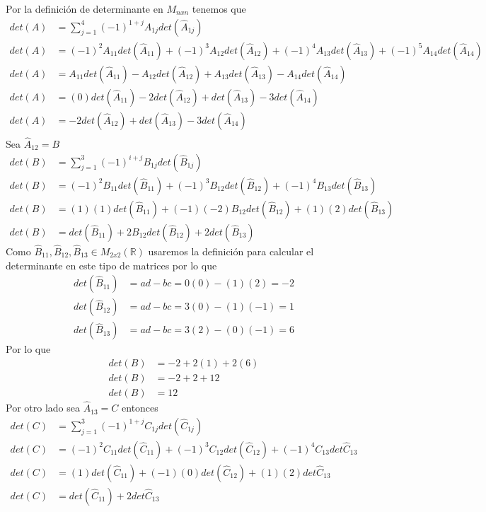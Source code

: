 \documentclass[letterpaper]{article}
\newcommand{\R}{\mathds{R}}
\renewcommand{\*}{\cdot}
\theoremstyle{definition}
\begin{document}
	Por la definición de determinante en $ M_{nxn} $ tenemos que 
	\begin{align*}
		det(A) &= \sum_{j = 1}^{4} (-1)^{1+j} A_{1j} det(\hat{A}_{1j})\\
		det(A) &= (-1)^{2} A_{11} det(\hat{A}_{11}) + (-1)^{3} A_{12} det(\hat{A}_{12}) + (-1)^{4} A_{13} det(\hat{A}_{13}) + (-1)^{5} A_{14} det(\hat{A}_{14})\\
		det(A) &= A_{11} det(\hat{A}_{11}) -A_{12} det(\hat{A}_{12}) +A_{13} det(\hat{A}_{13}) -A_{14} det(\hat{A}_{14})\\
		det(A) &= (0)det(\hat{A}_{11}) -2det(\hat{A}_{12}) +det(\hat{A}_{13}) -3det(\hat{A}_{14})\\
		det(A) &= -2det(\hat{A}_{12}) +det(\hat{A}_{13}) -3det(\hat{A}_{14})\\
	\end{align*}
	Sea $ \hat{A}_{12}  = B $ 
	\begin{align*}
	det(B) &= \sum_{j = 1}^{3} (-1)^{i+j} B_{1j} det (\hat{B}_{1j}) \\
	det(B) &= (-1)^{2} B_{11} det(\hat{B}_{11}) + (-1)^{3} B_{12} det(\hat{B}_{12}) + (-1)^4 B_{13} det(\hat{B}_{13}) \\
	det(B) &= (1)(1) det(\hat{B}_{11}) + (-1)(-2) B_{12} det(\hat{B}_{12}) + (1)(2) det(\hat{B}_{13}) \\
	det(B) &= det(\hat{B}_{11}) + 2 B_{12} det(\hat{B}_{12}) + 2 det(\hat{B}_{13}) 
	\end{align*}
	Como $ \hat{B}_{11}, \hat{B}_{12}, \hat{B}_{13} \in M_{2x2}(\R) $ usaremos la definición para calcular el determinante en este tipo de matrices por lo que
	\begin{align*}
		det(\hat{B}_{11}) & = ad-bc = 0(0) - (1)(2) = -2\\
		det(\hat{B}_{12}) & = ad-bc = 3(0) - (1)(-1) = 1\\
		det(\hat{B}_{13}) & = ad-bc = 3(2) - (0)(-1) = 6
	\end{align*}
	Por lo que 
	\begin{align*}
		det(B) &= -2 +2(1) + 2(6)\\
		det(B) &= -2 +2 + 12\\
		det(B) &= 12
	\end{align*}
	Por otro lado sea $ \hat{A}_{13} = C $ entonces
	\begin{align*}
		det(C) & = \sum_{j = 1}^3 (-1)^{1+j} C_{1j} det(\hat{C}_{1j})\\
		det(C) & = (-1)^2 C_{11} det(\hat{C}_{11}) + (-1)^3 C_{12}det(\hat{C}_{12}) + (-1)^4 C_{13} det \hat{C}_{13} \\
		det(C) & = (1)det(\hat{C}_{11}) + (-1)(0)det(\hat{C}_{12}) + (1)(2) det \hat{C}_{13} \\
		det(C) & = det(\hat{C}_{11}) + 2det \hat{C}_{13}
	\end{align*}
\end{document}
